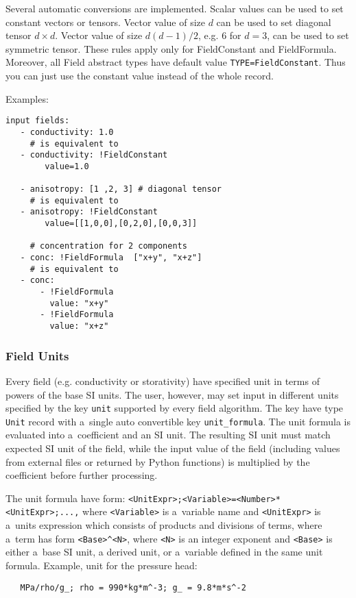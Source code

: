 Several automatic conversions are implemented. Scalar values can be used to set constant vectors or tensors. Vector value of size $d$ can be used to set diagonal tensor $d\times d$.
Vector value of size $d(d-1)/2$, e.g. $6$ for $d=3$, can be used to set symmetric tensor. These rules apply only for FieldConstant and FieldFormula.
Moreover, all Field abstract types have default value \verb'TYPE=FieldConstant'. Thus you can just use the constant value instead of the whole record.

Examples:
\begin{verbatim}
input fields:
   - conductivity: 1.0
     # is equivalent to
   - conductivity: !FieldConstant
        value=1.0
   
   - anisotropy: [1 ,2, 3] # diagonal tensor
     # is equivalent to
   - anisotropy: !FieldConstant
        value=[[1,0,0],[0,2,0],[0,0,3]]

     # concentration for 2 components   
   - conc: !FieldFormula  ["x+y", "x+z"]
     # is equivalent to
   - conc: 
       - !FieldFormula
         value: "x+y"
       - !FieldFormula
         value: "x+z"
\end{verbatim}

\subsubsection{Field Units}
Every field (e.g. conductivity or storativity) have specified unit in terms of powers of the base SI units. 
The user, however, may set input in different units specified by the key \verb'unit' 
supported by every field algorithm. The key have type \verb'Unit' record with a~single auto convertible key 
\verb'unit_formula'. The unit formula is evaluated  into a~coefficient and an SI unit. The resulting SI unit 
must match expected SI unit of the field, while the input value 
of the field (including values from external files or returned by Python functions)  
is multiplied by the coefficient before further processing.

The unit formula have form: {\tt <UnitExpr>;<Variable>=<Number>*<UnitExpr>;...,}
where {\tt <Variable>} is a~variable name and {\tt <UnitExpr>} is a~units expression
which consists of products and divisions of terms, where a~term has form \verb'<Base>^<N>', 
where {\tt <N>} is an integer exponent and {\tt <Base>} is either a~base SI unit, 
a derived unit, or a~variable defined in the same unit formula.
Example, unit for the pressure head: 
\begin{verbatim}
   MPa/rho/g_; rho = 990*kg*m^-3; g_ = 9.8*m*s^-2
\end{verbatim}


